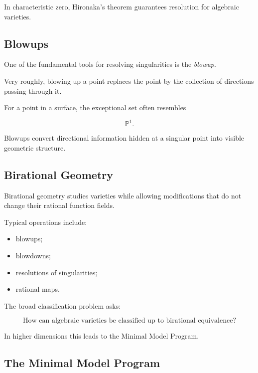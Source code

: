 In characteristic zero, Hironaka's theorem guarantees resolution for
algebraic varieties.

\subsection{Blowups}
\label{subsec:algebraic-blowups}

One of the fundamental tools for resolving singularities is the
\emph{blowup}.

Very roughly, blowing up a point replaces the point by the collection of
directions passing through it.

For a point in a surface, the exceptional set often resembles

\[
\boxed{
\mathbb{P}^1.
}
\]

Blowups convert directional information hidden at a singular point into
visible geometric structure.

\subsection{Birational Geometry}
\label{subsec:birational-geometry-preview}

Birational geometry studies varieties while allowing modifications that do
not change their rational function fields.

Typical operations include:

\begin{itemize}
    \item blowups;
    \item blowdowns;
    \item resolutions of singularities;
    \item rational maps.
\end{itemize}

The broad classification problem asks:

\[
\boxed{
\text{How can algebraic varieties be classified up to birational
equivalence?}
}
\]

In higher dimensions this leads to the Minimal Model Program.

\subsection{The Minimal Model Program}
\label{subsec:minimal-model-program-preview}

